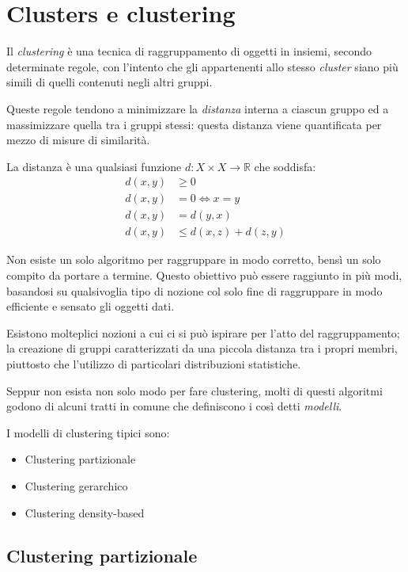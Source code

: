 \chapter{Clusters e clustering}

Il \emph{clustering} è una tecnica di raggruppamento di oggetti in insiemi, secondo determinate regole, con l'intento che gli appartenenti allo stesso \emph{cluster} siano più simili di quelli contenuti negli altri gruppi.

Queste regole tendono a minimizzare la \emph{distanza} interna a ciascun gruppo ed a massimizzare quella tra i gruppi stessi: questa distanza viene quantificata per mezzo di misure di similarità.

La distanza è una qualsiasi funzione $d:X \times X \to \mathbb{R}$ che soddisfa:
\begin{align*}
	d(x,y) &\geq 0 \\
	d(x,y) &= 0 \iff x=y \\
	d(x,y) &= d(y,x) \\
	d(x,y) &\leq d(x,z) + d(z,y)
\end{align*}

Non esiste un solo algoritmo per raggruppare in modo corretto, bensì un solo compito da portare a termine. Questo obiettivo può essere raggiunto in più modi, basandosi su qualsivoglia tipo di nozione col solo fine di raggruppare in modo efficiente e sensato gli oggetti dati. 

Esistono molteplici nozioni a cui ci si può ispirare per l'atto del raggruppamento; la creazione di gruppi caratterizzati da una piccola distanza tra i propri membri, piuttosto che l'utilizzo di particolari distribuzioni statistiche.

Seppur non esista non solo modo per fare clustering, molti di questi algoritmi godono di alcuni tratti in comune che definiscono i così detti \emph{modelli}.

I modelli di clustering tipici sono:
\begin{itemize}
	\item Clustering partizionale 
	\item Clustering gerarchico 
	\item Clustering density-based 
\end{itemize}

\section{Clustering partizionale}
	
